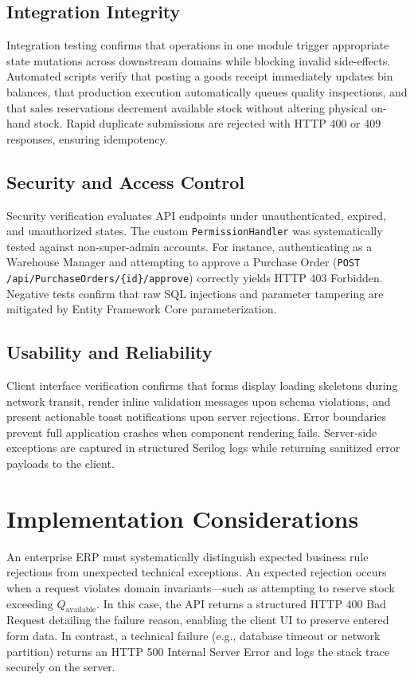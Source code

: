 \documentclass[conference]{IEEEtran}
\begin{document}
\subsection{Integration Integrity}
Integration testing confirms that operations in one module trigger appropriate state mutations across downstream domains while blocking invalid side-effects. Automated scripts verify that posting a goods receipt immediately updates bin balances, that production execution automatically queues quality inspections, and that sales reservations decrement available stock without altering physical on-hand stock. Rapid duplicate submissions are rejected with HTTP 400 or 409 responses, ensuring idempotency.

\subsection{Security and Access Control}
Security verification evaluates API endpoints under unauthenticated, expired, and unauthorized states. The custom \texttt{PermissionHandler} was systematically tested against non-super-admin accounts. For instance, authenticating as a Warehouse Manager and attempting to approve a Purchase Order (\texttt{POST /api/PurchaseOrders/\{id\}/approve}) correctly yields HTTP 403 Forbidden. Negative tests confirm that raw SQL injections and parameter tampering are mitigated by Entity Framework Core parameterization.

\subsection{Usability and Reliability}
Client interface verification confirms that forms display loading skeletons during network transit, render inline validation messages upon schema violations, and present actionable toast notifications upon server rejections. Error boundaries prevent full application crashes when component rendering fails. Server-side exceptions are captured in structured Serilog logs while returning sanitized error payloads to the client.

\section{Implementation Considerations}
An enterprise ERP must systematically distinguish expected business rule rejections from unexpected technical exceptions. An expected rejection occurs when a request violates domain invariants—such as attempting to reserve stock exceeding $Q_{\text{available}}$. In this case, the API returns a structured HTTP 400 Bad Request detailing the failure reason, enabling the client UI to preserve entered form data. In contrast, a technical failure (e.g., database timeout or network partition) returns an HTTP 500 Internal Server Error and logs the stack trace securely on the server.
\end{document}
